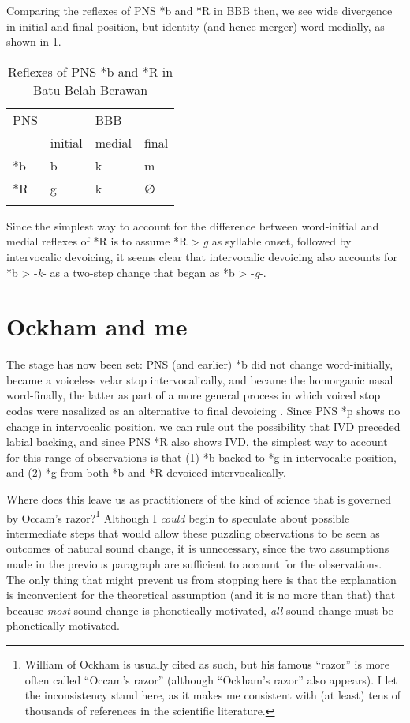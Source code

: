\documentclass[output=paper]{langscibook}
\begin{document}
Comparing the reflexes of PNS *b and *R in BBB then, we see wide divergence in initial and final position, but identity (and hence merger) word-medially, as shown in \cref{tab:BBB-b-R}.\pagebreak

\begin{table}
\caption{\label{tab:BBB-b-R}Reflexes of PNS *b and *R in Batu Belah Berawan}
\begin{tabular}{llll}
\lsptoprule
  PNS  &   &  BBB\\\cmidrule{2-4}
     &initial &   medial  &  final   \\\midrule
  *b &    b   & k         &     m    \\
  *R &    g   & k         &     ∅    \\
  \lspbottomrule
\end{tabular}
\end{table}

Since the simplest way to account for the difference between word-initial and medial reflexes of *R is to assume *R > \textit{g} as syllable onset, followed by intervocalic devoicing, it seems clear that intervocalic devoicing also accounts for *b > -\textit{k}- as a two-step change that began as *b > -\textit{g}-.

\section{Ockham and me}\label{sec:Ockham-Me}
The stage has now been set: PNS (and earlier) *b did not change word-initially, became a voiceless velar stop intervocalically, and became the homorganic nasal word-finally, the latter as part of a more general process in which voiced stop codas were nasalized as an alternative to final devoicing \citep{Blust2018}. Since PNS *p shows no change in intervocalic position, we can rule out the possibility that IVD preceded labial backing, and since PNS *R also shows IVD, the simplest way to account for this range of observations is that (1) *b backed to *g in intervocalic position, and (2) *g from both *b and *R devoiced intervocalically.

Where does this leave us as practitioners of the kind of science that is governed by Occam’s razor?\footnote{William of Ockham is usually cited as such, but his famous “razor” is more often called “Occam’s razor” (although “Ockham’s razor” also appears). I let the inconsistency stand here, as it makes me consistent with (at least) tens of thousands of references in the scientific literature.} Although I \textit{could} begin to speculate about possible intermediate steps that would allow these puzzling observations to be seen as outcomes of natural sound change, it is unnecessary, since the two assumptions made in the previous paragraph are sufficient to account for the observations. The only thing that might prevent us from stopping here is that the explanation is inconvenient for the theoretical assumption (and it is no more than that) that because \textit{most} sound change is phonetically motivated, \textit{all} sound change must be phonetically motivated.
\end{document}
